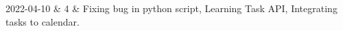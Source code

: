 2022-04-10 & 4 & Fixing bug in python script, Learning Task API, Integrating tasks to calendar. \\[10pt] \hline
